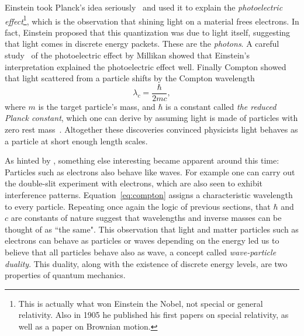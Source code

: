 Einstein took Planck's idea seriously~\cite{Einstein:1905cc}
and used it to explain the {\it photoelectric
effect}\footnote{This is actually what won Einstein the Nobel, not special or
general relativity. Also in 1905 he published his first
papers on special relativity, as well as a paper on Brownian motion.},
which is the observation that shining light on a material frees electrons. 
In fact, Einstein proposed that this quantization was due to light itself, 
suggesting that light comes
in discrete energy packets. These are the {\it photons}.
A careful study~\cite{millikan_direct_1916} of the photoelectric effect by
Millikan showed that
Einstein's interpretation explained the photoelectric effect well. Finally
Compton showed that light scattered from a particle shifts by the Compton
wavelength
\begin{equation}\label{eq:compton}
  \lambda_c=\frac{\hbar}{2mc},
\end{equation}
where $m$ is the target particle's mass, and $\hbar$ is a constant called
{\it the reduced Planck constant}, 
which one can derive by assuming light
is made of particles with zero rest mass~\cite{Compton:1923zz}.
Altogether these discoveries convinced physicists light behaves as a particle
at short enough length scales. 

As hinted by , something else interesting became apparent
around this time: Particles such as electrons also behave like waves. For
example one can carry out the double-slit experiment with electrons, which are
also seen to exhibit interference patterns. Equation~\eqref{eq:compton} assigns
a characteristic wavelength to every particle. Repeating once again the logic of
previous sections, that $\hbar$ and $c$ are constants of nature suggest that
wavelengths and inverse masses can be thought of as ``the same".
This observation that light and matter particles such as electrons can behave as
particles or waves depending on the energy led us to believe that all particles
behave also as wave, a concept called {\it wave-particle
duality}. This duality, along with the existence of
discrete energy levels, are two properties of quantum mechanics.


